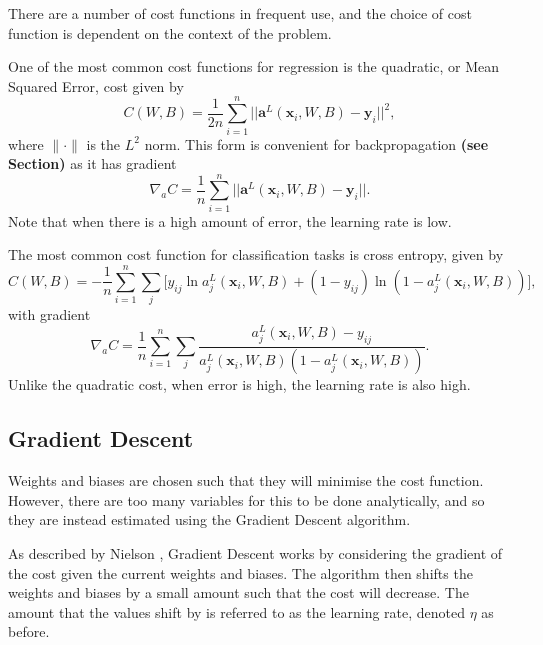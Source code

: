 \documentclass[honours,12pt]{unswthesis}
\numberwithin{equation}{section}
\begin{document}
There are a number of cost functions in frequent use, and the choice of cost function is dependent on the context of the problem.

One of the most common cost functions for regression is the quadratic, or Mean Squared Error, cost given by
\[
	C(W,B) = \dfrac{1}{2n}\sum_{i=1}^n||\mathbf{a}^L(\mathbf{x}_i,W,B) - \mathbf{y}_i ||^2,
\]
where $\|\cdot\|$ is the $L^2$ norm. This form is convenient for backpropagation \textbf{(see Section)} as it has gradient
\[
	\nabla_aC = \dfrac{1}{n}\sum_{i=1}^n||\mathbf{a}^L(\mathbf{x}_i,W,B) - \mathbf{y}_i ||.
\]
Note that when there is a high amount of error, the learning rate is low.

The most common cost function for classification tasks is cross entropy, given by
\[
	C(W,B) = -\dfrac{1}{n}\sum_{i=1}^n\sum_j\big[y_{ij}\ln a_j^L(\mathbf{x}_i,W,B) + (1 - y_{ij})\ln (1 - a_j^L(\mathbf{x}_i,W,B))\big],
\]
with gradient
\[
	\nabla_aC = \dfrac{1}{n}\sum_{i=1}^n\sum_j\dfrac{a_j^L(\mathbf{x}_i,W,B) - y_{ij}}{a_j^L(\mathbf{x}_i,W,B)(1-a_j^L(\mathbf{x}_i,W,B))}.
\]
Unlike the quadratic cost, when error is high, the learning rate is also high.


\subsection{Gradient Descent}\label{nnets-graddesc}

Weights and biases are chosen such that they will minimise the cost function. However, there are too many variables for this to be done analytically, and so they are instead estimated using the Gradient Descent algorithm.

As described by Nielson \cite{Nielson2015}, Gradient Descent works by considering the gradient of the cost given the current weights and biases. The algorithm then shifts the weights and biases by a small amount such that the cost will decrease. The amount that the values shift by is referred to as the learning rate, denoted $\eta$ as before.
\end{document}
